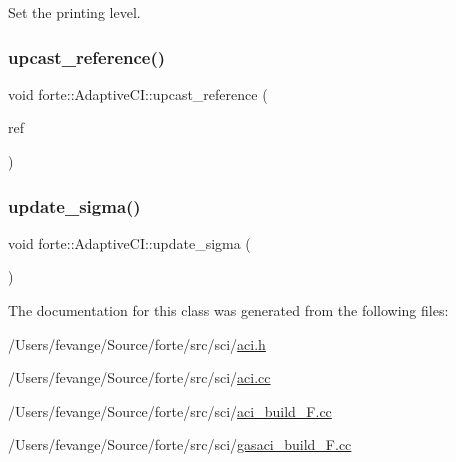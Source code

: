Set the printing level. 

\mbox{\label{classforte_1_1_adaptive_c_i_ae4d307b8c98ae205056da0ab40585317}} 
\subsubsection{\texorpdfstring{upcast\+\_\+reference()}{upcast\_reference()}}
{\footnotesize\ttfamily void forte\+::\+Adaptive\+C\+I\+::upcast\+\_\+reference (\begin{DoxyParamCaption}\item[{\mbox{\hyperlink{classforte_1_1_determinant_hash_vec}{Determinant\+Hash\+Vec}} \&}]{ref }\end{DoxyParamCaption})}

\mbox{\label{classforte_1_1_adaptive_c_i_aa41514cfd2b49b8978196fc6991f6e3a}} 
\subsubsection{\texorpdfstring{update\+\_\+sigma()}{update\_sigma()}}
{\footnotesize\ttfamily void forte\+::\+Adaptive\+C\+I\+::update\+\_\+sigma (\begin{DoxyParamCaption}{ }\end{DoxyParamCaption})}



The documentation for this class was generated from the following files\+:\begin{DoxyCompactItemize}
\item 
/\+Users/fevange/\+Source/forte/src/sci/\mbox{\hyperlink{aci_8h}{aci.\+h}}\item 
/\+Users/fevange/\+Source/forte/src/sci/\mbox{\hyperlink{aci_8cc}{aci.\+cc}}\item 
/\+Users/fevange/\+Source/forte/src/sci/\mbox{\hyperlink{aci__build___f_8cc}{aci\+\_\+build\+\_\+\+F.\+cc}}\item 
/\+Users/fevange/\+Source/forte/src/sci/\mbox{\hyperlink{gasaci__build___f_8cc}{gasaci\+\_\+build\+\_\+\+F.\+cc}}\end{DoxyCompactItemize}
